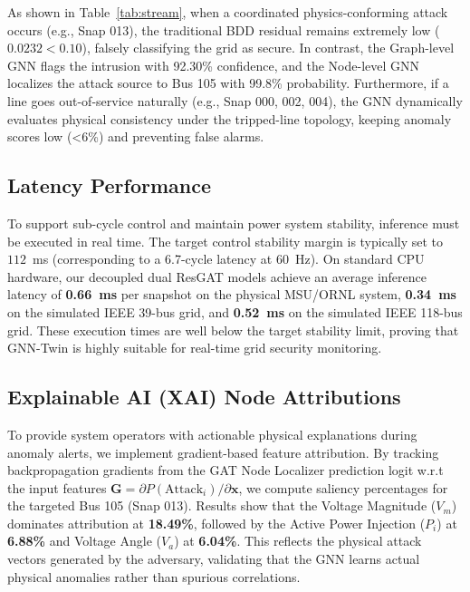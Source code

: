 \documentclass[10pt, a4paper, twocolumn]{article}
\begin{document}
As shown in Table~\ref{tab:stream}, when a coordinated physics-conforming attack occurs (e.g., Snap 013), the traditional BDD residual remains extremely low ($0.0232 < 0.10$), falsely classifying the grid as secure. In contrast, the Graph-level GNN flags the intrusion with 92.30\% confidence, and the Node-level GNN localizes the attack source to Bus 105 with 99.8\% probability. Furthermore, if a line goes out-of-service naturally (e.g., Snap 000, 002, 004), the GNN dynamically evaluates physical consistency under the tripped-line topology, keeping anomaly scores low (<6\%) and preventing false alarms.

\subsection{Latency Performance}
To support sub-cycle control and maintain power system stability, inference must be executed in real time. The target control stability margin is typically set to $112$~ms (corresponding to a 6.7-cycle latency at 60~Hz). On standard CPU hardware, our decoupled dual ResGAT models achieve an average inference latency of \textbf{0.66~ms} per snapshot on the physical MSU/ORNL system, \textbf{0.34~ms} on the simulated IEEE 39-bus grid, and \textbf{0.52~ms} on the simulated IEEE 118-bus grid. These execution times are well below the target stability limit, proving that GNN-Twin is highly suitable for real-time grid security monitoring.

\subsection{Explainable AI (XAI) Node Attributions}
To provide system operators with actionable physical explanations during anomaly alerts, we implement gradient-based feature attribution. By tracking backpropagation gradients from the GAT Node Localizer prediction logit w.r.t the input features $\mathbf{G} = \partial P(\text{Attack}_i)/\partial \mathbf{x}$, we compute saliency percentages for the targeted Bus 105 (Snap 013). Results show that the Voltage Magnitude ($V_m$) dominates attribution at \textbf{18.49\%}, followed by the Active Power Injection ($P_i$) at \textbf{6.88\%} and Voltage Angle ($V_a$) at \textbf{6.04\%}. This reflects the physical attack vectors generated by the adversary, validating that the GNN learns actual physical anomalies rather than spurious correlations.
\end{document}
